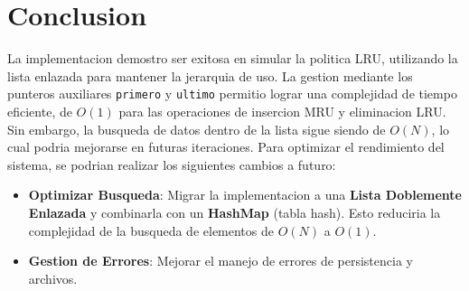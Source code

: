 \section{Conclusion}
La implementacion demostro ser exitosa en simular la politica LRU, utilizando la lista enlazada para mantener la jerarquia de uso. 
La gestion mediante los punteros auxiliares \texttt{primero} y \texttt{ultimo} permitio lograr una complejidad de tiempo eficiente, de $O(1)$ para las operaciones de insercion MRU y eliminacion LRU. 
Sin embargo, la busqueda de datos dentro de la lista sigue siendo de $O(N)$, lo cual podria mejorarse en futuras iteraciones.
Para optimizar el rendimiento del sistema, se podrian realizar los siguientes cambios a futuro:
\begin{itemize}
    \item \textbf{Optimizar Busqueda}: Migrar la implementacion a una \textbf{Lista Doblemente Enlazada} y combinarla con un \textbf{HashMap} (tabla hash). Esto reduciria la complejidad de la busqueda de elementos de $O(N)$ a $O(1)$.
    \item \textbf{Gestion de Errores}: Mejorar el manejo de errores de persistencia y archivos.
\end{itemize}